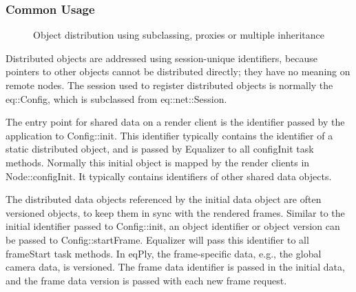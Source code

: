 \documentclass[10pt,a4]{scrartcl}
\begin{document}
\subsubsection{Common Usage}

\begin{figure}
  \vspace{-2ex}
  \hfil
  \hfil
  {\caption{\label{fObjectDist}Object distribution using subclassing,
      proxies or multiple inheritance}}
  \vspace{-4ex}
\end{figure}
Distributed objects are addressed using session-unique identifiers,
because pointers to other objects cannot be distributed directly; they
have no meaning on remote nodes. The session used to register
distributed objects is normally the \textsf{eq::Config}, which is
subclassed from \textsf{eq::net::Session}.

The entry point for shared data on a render client is the identifier
passed by the application to \textsf{Config::init}. This identifier
typically contains the identifier of a static distributed object, and is
passed by Equalizer to all \textsf{configInit} task methods. Normally
this initial object is mapped by the render clients in
\textsf{Node::configInit}. It typically contains identifiers of other
shared data objects.

The distributed data objects referenced by the initial data object are
often versioned objects, to keep them in sync with the rendered
frames. Similar to the initial identifier passed to
\textsf{Config::init}, an object identifier or object version can be
passed to \textsf{Config::startFrame}. Equalizer will pass this
identifier to all \textsf{frameStart} task methods. In \textsf{eqPly},
the frame-specific data, e.g., the global camera data, is versioned. The
frame data identifier is passed in the initial data, and the frame data
version is passed with each new frame request.
\end{document}
